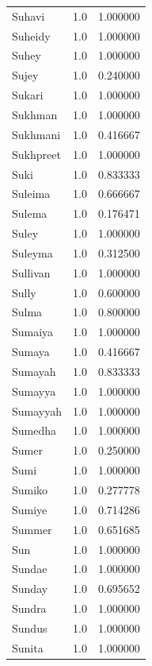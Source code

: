 \documentclass[
  letterpaper,
  DIV=11,
  numbers=noendperiod]{scrreprt}
\begin{document}
\begin{tabular}{lrr}
Suhavi          &   1.0 &   1.000000 \\
Suheidy         &   1.0 &   1.000000 \\
Suhey           &   1.0 &   1.000000 \\
Sujey           &   1.0 &   0.240000 \\
Sukari          &   1.0 &   1.000000 \\
Sukhman         &   1.0 &   1.000000 \\
Sukhmani        &   1.0 &   0.416667 \\
Sukhpreet       &   1.0 &   1.000000 \\
Suki            &   1.0 &   0.833333 \\
Suleima         &   1.0 &   0.666667 \\
Sulema          &   1.0 &   0.176471 \\
Suley           &   1.0 &   1.000000 \\
Suleyma         &   1.0 &   0.312500 \\
Sullivan        &   1.0 &   1.000000 \\
Sully           &   1.0 &   0.600000 \\
Sulma           &   1.0 &   0.800000 \\
Sumaiya         &   1.0 &   1.000000 \\
Sumaya          &   1.0 &   0.416667 \\
Sumayah         &   1.0 &   0.833333 \\
Sumayya         &   1.0 &   1.000000 \\
Sumayyah        &   1.0 &   1.000000 \\
Sumedha         &   1.0 &   1.000000 \\
Sumer           &   1.0 &   0.250000 \\
Sumi            &   1.0 &   1.000000 \\
Sumiko          &   1.0 &   0.277778 \\
Sumiye          &   1.0 &   0.714286 \\
Summer          &   1.0 &   0.651685 \\
Sun             &   1.0 &   1.000000 \\
Sundae          &   1.0 &   1.000000 \\
Sunday          &   1.0 &   0.695652 \\
Sundra          &   1.0 &   1.000000 \\
Sundus          &   1.0 &   1.000000 \\
Sunita          &   1.0 &   1.000000 \\

\end{tabular}
\end{document}
